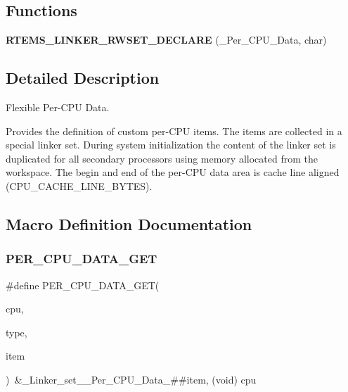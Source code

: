 \subsection*{Functions}
\begin{DoxyCompactItemize}
\item 
\mbox{\label{group__PerCPUData_gadfc060478b8184307cacf53a06582714}} 
{\bfseries R\+T\+E\+M\+S\+\_\+\+L\+I\+N\+K\+E\+R\+\_\+\+R\+W\+S\+E\+T\+\_\+\+D\+E\+C\+L\+A\+RE} (\+\_\+\+Per\+\_\+\+C\+P\+U\+\_\+\+Data, char)
\end{DoxyCompactItemize}


\subsection{Detailed Description}
Flexible Per-\/\+C\+PU Data. 

Provides the definition of custom per-\/\+C\+PU items. The items are collected in a special linker set. During system initialization the content of the linker set is duplicated for all secondary processors using memory allocated from the workspace. The begin and end of the per-\/\+C\+PU data area is cache line aligned (C\+P\+U\+\_\+\+C\+A\+C\+H\+E\+\_\+\+L\+I\+N\+E\+\_\+\+B\+Y\+T\+ES). 

\subsection{Macro Definition Documentation}
\mbox{\label{group__PerCPUData_gade0bfa7d761c3fecd76535570234a98e}} 
\subsubsection{\texorpdfstring{PER\_CPU\_DATA\_GET}{PER\_CPU\_DATA\_GET}}
{\footnotesize\ttfamily \#define P\+E\+R\+\_\+\+C\+P\+U\+\_\+\+D\+A\+T\+A\+\_\+\+G\+ET(\begin{DoxyParamCaption}\item[{}]{cpu,  }\item[{}]{type,  }\item[{}]{item }\end{DoxyParamCaption})~\&\+\_\+\+Linker\+\_\+set\+\_\+\+\_\+\+Per\+\_\+\+C\+P\+U\+\_\+\+Data\+\_\+\#\#item, (void) cpu}



